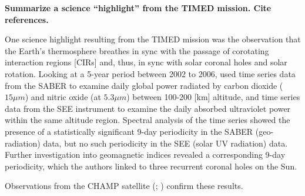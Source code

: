 \textbf{Summarize a science ``highlight'' from the TIMED mission. Cite
references.}

One science highlight resulting from the TIMED mission was the
observation that the Earth's thermosphere breathes in sync with the
passage of corotating interaction regions [CIRs] and, thus, in sync with solar
coronal holes and solar rotation. Looking at a 5-year period between
2002 to 2006, \cite{Mlynczak2008} used time series data from the SABER to examine
daily global power radiated by carbon dioxide ($15 \mu m$)
and nitric oxide (at $5.3 \mu m$) between 100-200 [km] altitude, and time
series data from the SEE instrument to examine the daily absorbed ultraviolet power
within the same altitude region. Spectral analysis of the time series
showed the presence of a statistically significant 9-day periodicity in
the SABER (geo-radiation) data, but no such periodicity in the SEE
(solar UV radiation) data. Further investigation into geomagnetic
indices revealed a corresponding 9-day periodicity, which the authors
linked to three recurrent coronal holes on the Sun. 

Observations from the CHAMP satellite (\cite{Thayer2008};
\cite{Lei2008}) confirm these results.
